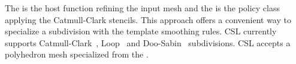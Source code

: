 \documentclass[twocolumn]{article}
\begin{document}
\noindent The  
is the host function refining the input mesh
and the  is the policy 
class applying the Catmull-Clark stencils.
This approach offers a convenient way to
specialize a subdivision with the template smoothing rules.
CSL currently supports Catmull-Clark~\cite{cc}, 
Loop~\cite{loop} and Doo-Sabin~\cite{ds} subdivisions.
CSL accepts a polyhedron mesh specialized from the
\cgalpoly .  


{\footnotesize


}
\end{document}
